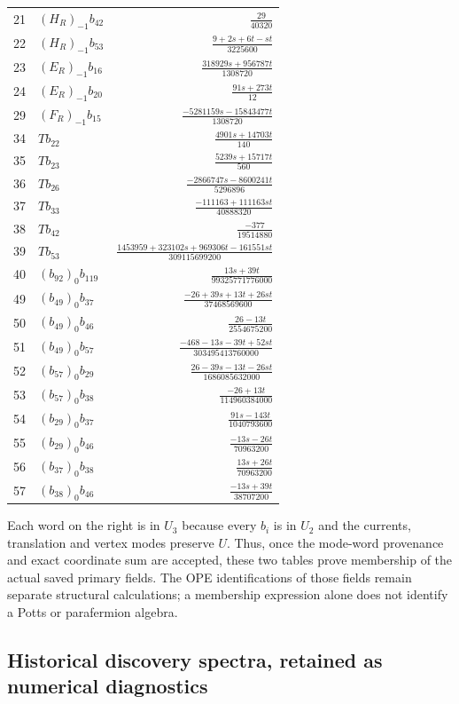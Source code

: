 \begin{longtable}{@{}rlr@{}}
21 & $(H_R)_{-1}b_{42}$ & $\frac{29}{40320}$\\
22 & $(H_R)_{-1}b_{53}$ & $\frac{9+2s+6t-st}{3225600}$\\
23 & $(E_R)_{-1}b_{16}$ & $\frac{318929s+956787t}{1308720}$\\
24 & $(E_R)_{-1}b_{20}$ & $\frac{91s+273t}{12}$\\
29 & $(F_R)_{-1}b_{15}$ & $\frac{-5281159s-15843477t}{1308720}$\\
34 & $Tb_{22}$ & $\frac{4901s+14703t}{140}$\\
35 & $Tb_{23}$ & $\frac{5239s+15717t}{560}$\\
36 & $Tb_{26}$ & $\frac{-2866747s-8600241t}{5296896}$\\
37 & $Tb_{33}$ & $\frac{-111163+111163st}{40888320}$\\
38 & $Tb_{42}$ & $\frac{-377}{19514880}$\\
39 & $Tb_{53}$ & $\frac{1453959+323102s+969306t-161551st}{309115699200}$\\
40 & $(b_{92})_0b_{119}$ & $\frac{13s+39t}{99325771776000}$\\
49 & $(b_{49})_0b_{37}$ & $\frac{-26+39s+13t+26st}{37468569600}$\\
50 & $(b_{49})_0b_{46}$ & $\frac{26-13t}{2554675200}$\\
51 & $(b_{49})_0b_{57}$ & $\frac{-468-13s-39t+52st}{303495413760000}$\\
52 & $(b_{57})_0b_{29}$ & $\frac{26-39s-13t-26st}{1686085632000}$\\
53 & $(b_{57})_0b_{38}$ & $\frac{-26+13t}{114960384000}$\\
54 & $(b_{29})_0b_{37}$ & $\frac{91s-143t}{1040793600}$\\
55 & $(b_{29})_0b_{46}$ & $\frac{-13s-26t}{70963200}$\\
56 & $(b_{37})_0b_{38}$ & $\frac{13s+26t}{70963200}$\\
57 & $(b_{38})_0b_{46}$ & $\frac{-13s+39t}{38707200}$\\
\end{longtable}
\endgroup
Each word on the right is in $U_3$ because every $b_i$ is in $U_2$
and the currents, translation and vertex modes preserve $U$. Thus,
once the mode-word provenance and exact coordinate sum are accepted,
these two tables prove membership of the actual saved primary fields.
The OPE identifications of those fields remain separate structural
calculations; a membership expression alone does not identify a Potts
or parafermion algebra.


\subsection{Historical discovery spectra, retained as numerical diagnostics}
\label{expfinite:discovery-spectra}

